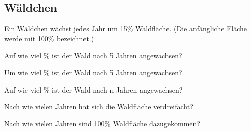 \platzFuerBerechnungenBisEndeSeite{}
\TRAINER{\newpage}
\subsection{Wäldchen}
Ein Wäldchen wächst jedes Jahr um 15\% Waldfläche. (Die anfängliche Fläche werde mit
100\% bezeichnet.)
\begin{bbwAufgabenBlock}
\item Auf wie viel \% ist der Wald nach 5 Jahren angewachsen?  
\item Um wie viel \% ist der Wald nach 5 Jahren angewachsen?  
\item Auf wie viel \% ist der Wald nach n Jahren
angewachsen?   \noTRAINER{\seitenUmbruchImAufgabenteil{}}
\item Nach wie vielen Jahren hat sich die Waldfläche
verdreifacht?  
\item Nach wie vielen Jahren sind 100\% Waldfläche
dazugekommen?  
\end{bbwAufgabenBlock}

\platzFuerBerechnungenBisEndeSeite{}


